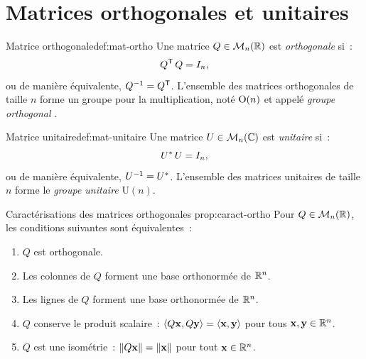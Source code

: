 \section{Matrices orthogonales et unitaires}\label{sec:ortho-unitaire}

\begin{definition}{Matrice orthogonale}{def:mat-ortho}
  Une matrice $Q\in\mathcal{M}_n({\mathbb{R}})$ est \emph{orthogonale} si~:
  \[
    {Q}^{\mathsf{T}}\,Q=I_n,
  \]
  ou de manière équivalente, ${Q}^{-1}={Q}^{\mathsf{T}}$. L'ensemble des
  matrices orthogonales de taille $n$ forme un groupe pour la
  multiplication, noté $\operatorname{O}(n)$ et appelé \emph{groupe orthogonal}%
  .
\end{definition}

\begin{definition}{Matrice unitaire}{def:mat-unitaire}
  Une matrice $U\in\mathcal{M}_n({\mathbb{C}})$ est \emph{unitaire} si~:
  \[
    {U}^{*}\,U=I_n,
  \]
  ou de manière équivalente, ${U}^{-1}={U}^{*}$. L'ensemble des
  matrices unitaires de taille $n$ forme le \emph{groupe unitaire}
  $\mathrm{U}(n)$.
\end{definition}

\begin{proposition}{Caractérisations des matrices orthogonales}%
{prop:caract-ortho}
  Pour $Q\in\mathcal{M}_n({\mathbb{R}})$, les conditions suivantes sont équivalentes~:
  \begin{enumerate}[label=(\roman*)]
    \item $Q$ est orthogonale.
    \item Les colonnes de $Q$ forment une base orthonormée de ${\mathbb{R}}^n$.
    \item Les lignes de $Q$ forment une base orthonormée de ${\mathbb{R}}^n$.
    \item $Q$ conserve le produit scalaire~:
      $\langle Q\mathbf{x},Q\mathbf{y}\rangle=\langle\mathbf{x},\mathbf{y}\rangle$ pour tous
      $\mathbf{x},\mathbf{y}\in{\mathbb{R}}^n$.
    \item $Q$ est une isométrie~:
      $\lVert Q\mathbf{x}\rVert=\lVert\mathbf{x}\rVert$ pour tout $\mathbf{x}\in{\mathbb{R}}^n$.
  \end{enumerate}
\end{proposition}

